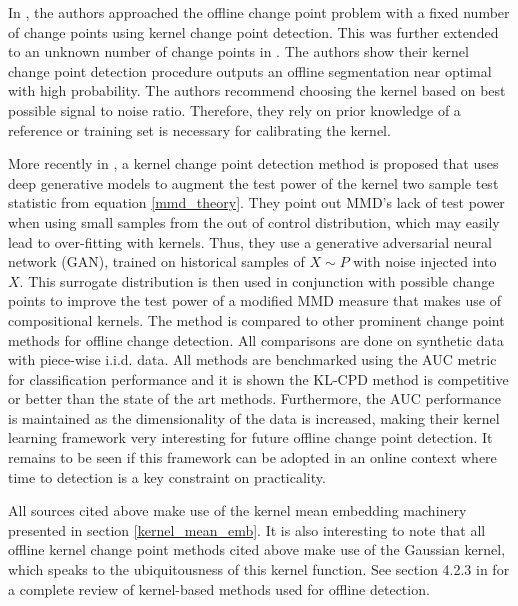 In \cite{harchaoui2007retrospective}, the authors approached the offline change point problem with a fixed number of change points using kernel change point detection. This was further extended to an unknown number of change points in \cite{arlot2012kernel}. The authors show their kernel change point detection procedure outputs an offline segmentation near optimal with high probability. The authors recommend choosing the kernel based on best possible signal to noise ratio. Therefore, they rely on prior knowledge of a reference or training set is necessary for calibrating the kernel. 

More recently in \cite{chang2019kernel}, a  kernel change point detection method is proposed that uses deep generative models to augment the test power of the kernel two sample test statistic from equation \ref{mmd_theory}. They point out MMD's lack of test power when using small samples from the out of control distribution, which may easily lead to over-fitting with kernels. Thus, they use a generative adversarial neural network (GAN), trained on historical samples of $X \sim  P$  with noise injected into $X$. This surrogate distribution is then used in conjunction with possible change points to improve the test power of a modified MMD measure that makes use of compositional kernels. The method is compared to other prominent change point methods for offline change detection. All comparisons are done on synthetic data with piece-wise i.i.d. data. All methods are benchmarked using the AUC metric for classification performance and it is shown the KL-CPD method is competitive or better than the state of the art methods.  Furthermore, the AUC performance is maintained as the dimensionality of the data is increased, making their kernel learning framework very interesting for future offline change point detection. It remains to be seen if this framework can be adopted in an online context where time to detection is a key constraint on practicality.

All sources cited above make use of the kernel mean embedding machinery presented in section \ref{kernel_mean_emb}. It is also interesting to note that all offline kernel change point methods cited above make use of the Gaussian kernel, which speaks to the ubiquitousness of this kernel function. See section 4.2.3  in \cite{truong2018review} for a complete review of kernel-based methods used for offline detection. 

